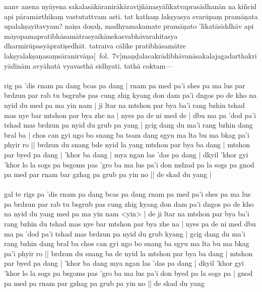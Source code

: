 \documentclass[12pt]{article}
\newcommand{\emdash} {\hspace{0em}—\hspace{0em}}
\begin{document}
nanv anena nyāyena sakalasākāranirākāravijñānasyālīkatvaprasādhanān na kiñcid api pāramārthikaṃ vastutattvam asti.\footnoteB{
	asti] \conj ; astīti \MS\ \EDD\ (astīti?) (\emph{iti} has no reflex in \TIB)
} tat kathaṃ lakṣyasya svarūpaṃ pramāṇata upalakṣayitavyam? naiṣa doṣaḥ, madhyamakamate pramāṇato 'līkatāsiddhāv api māyopamapratibhāsamātrasyaikānekasvabhāvarahitasya dharmirūpasyāpratiṣedhāt. tatraiva cālīke pratibhāsamātre lakṣyalakṣaṇasaṃsāranirvāṇa[\MS\ fol.\ 7v]maṇḍalacakrādibhāvanāsakalajagadarthakriyādīnām\footnoteB{
	°bhāvanā°] \MS ; °bhāvanā \EDD\ (variant word division); bsgoms pas \TIB\ (bhāvanayā)
} avyāhatā vyavasthā\footnoteB{
	vyavasthā] \MS ; vyavasthā ca \EDD\ (\emd)
} sidhyati.\footnoteB{
	sidhyati] \conj ; sidhyatīti \MS\ \EDD\ (\emph{no reflext of} iti in \TIB)
} tathā coktam\emdash \\

\textbf{\TVA}\\
rig pa 'dis rnam pa dang bcas pa dang | rnam pa med pa'i shes pa ma lus par brdzun par rab tu bsgrubs pas cung zhig kyang don dam pa'i dngos po de kho na nyid du med pa ma yin nam | ji ltar na mtshon par bya ba'i rang bzhin tshad mas nye bar mtshon par bya zhe na | nyes pa de ni med de | dbu ma pa 'dod pa'i tshad mas brdzun pa nyid du grub pa yang | gcig dang du ma'i rang bzhin dang bral ba | chos can gyi ngo bo snang ba tsam dang sgyu ma lta bu ma bkag pa'i phyir ro || brdzun du snang bde nyid la yang mtshon par bya ba dang | mtshon par byed pa dang | 'khor ba dang | mya ngan las 'das pa dang | dkyil 'khor gyi 'khor lo la sogs pa bsgoms pas 'gro ba ma lus pa'i don mdzad pa la sogs pa gnod pa med par rnam bar gzhag pa grub pa yin no || de skad du yang | \\

\textbf{\TVB}\\
gal te rigs pa 'dis rnam pa dang bcas pa dang rnam pa med pa'i shes pa ma lus pa brdzun par rab tu bsgrub pas cung zhig kyang don dam pa'i dngos po de kho na nyid du yang med pa ma yin nam <yin> | de ji ltar na mtshon par bya ba'i rang bzhin du tshad mas nye bar mtshon par bya zhe na | nyes pa de ni med dbu ma pa 'dod pa'i tshad mas brdzun pa nyid du grub kyang | gcig dang du ma'i rang bzhin dang bral ba chos can gyi ngo bo snang ba sgyu ma lta bu ma bkag pa'i phyir ro || brdzun du snang ba de nyid la mtshon par bya ba dang | mtshon par byed pa dang | 'khor ba dang mya ngan las 'das pa dang | dkyil 'khor gyi 'khor lo la sogs pa bsgoms pas 'gro ba ma lus pa'i don byed pa la sogs pa | gnod pa med pa rnam par gzhag pa grub pa yin no || de skad du yang 
\end{document}
